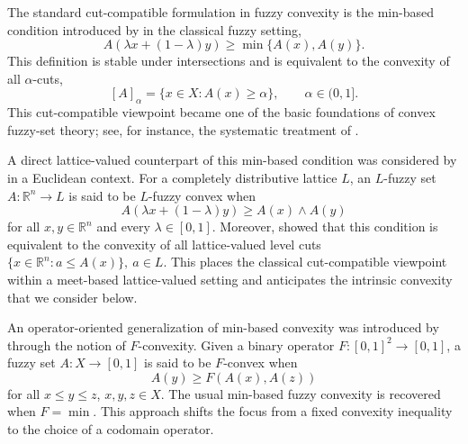 \documentclass[11pt,a4paper]{article}
\begin{document}
\smallskip

The standard cut-compatible formulation in fuzzy convexity is the min-based condition introduced by \citet{Zadeh1965} in the classical fuzzy setting,
\begin{equation}\label{eq:min-based-fuzzy-convexity}
A(\lambda x+(1-\lambda)y)
\geq
\min\{A(x),A(y)\}.
\end{equation}
This definition is stable under intersections and is equivalent to the convexity of all \(\alpha\)-cuts,
\begin{equation}\label{eq:alpha-cuts-classical}
[A]_\alpha=\{x\in X:A(x)\geq \alpha\},
\qquad \alpha\in(0,1].
\end{equation}
This cut-compatible viewpoint became one of the basic foundations of convex fuzzy-set theory; see, for instance, the systematic treatment of \citet{Lowen1980}.

\smallskip

A direct lattice-valued counterpart of this min-based condition was considered by \citet{Maruyama2009} in a Euclidean context. For a completely distributive lattice \(L\), an \(L\)-fuzzy set \(A:\mathbb{R}^n\to L\) is said to be \(L\)-fuzzy convex when
\begin{equation}\label{eq:maruyama-l-fuzzy-convexity}
A(\lambda x+(1-\lambda)y)
\geq
A(x)\wedge A(y)
\end{equation}
for all \(x,y\in\mathbb{R}^n\) and every \(\lambda\in[0,1]\). Moreover, \citet{Maruyama2009} showed that this condition is equivalent to the convexity of all lattice-valued level cuts
\(
\{x\in\mathbb{R}^n:a\leq A(x)\},
~ a\in L.
\)
This places the classical cut-compatible viewpoint within a meet-based lattice-valued setting and anticipates the intrinsic convexity that we consider below.

\smallskip

An operator-oriented generalization of min-based convexity was introduced by \citet{Diaz2017} through the notion of \(F\)-convexity. Given a binary operator \(F:[0,1]^2\to[0,1]\), a fuzzy set \(A:X\to[0,1]\) is said to be \(F\)-convex when
\begin{equation}\label{eq:F-convexity}
A(y)\geq F(A(x),A(z))
\end{equation}
for all \(x\leq y\leq z\), \(x,y,z\in X\). The usual min-based fuzzy convexity is recovered when \(F=\min\). This approach shifts the focus from a fixed convexity inequality to the choice of a codomain operator.

\smallskip
\end{document}

